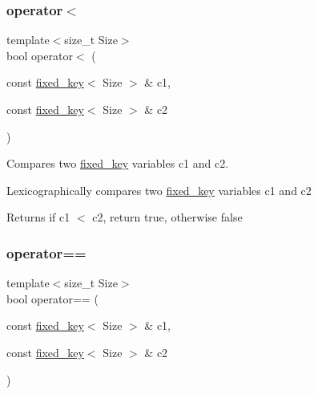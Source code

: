 \subsubsection{\texorpdfstring{operator$<$}{operator<}\hspace{0.1cm}{\footnotesize\ttfamily [2/2]}}
{\footnotesize\ttfamily template$<$size\+\_\+t Size$>$ \\
bool operator$<$ (\begin{DoxyParamCaption}\item[{const \mbox{\hyperlink{classaacio_1_1fixed__key}{fixed\+\_\+key}}$<$ Size $>$ \&}]{c1,  }\item[{const \mbox{\hyperlink{classaacio_1_1fixed__key}{fixed\+\_\+key}}$<$ Size $>$ \&}]{c2 }\end{DoxyParamCaption})\hspace{0.3cm}{\ttfamily [friend]}}



Compares two \mbox{\hyperlink{classaacio_1_1fixed__key}{fixed\+\_\+key}} variables c1 and c2. 

Lexicographically compares two \mbox{\hyperlink{classaacio_1_1fixed__key}{fixed\+\_\+key}} variables c1 and c2 \begin{DoxyReturn}{Returns}
if c1 $<$ c2, return true, otherwise false 
\end{DoxyReturn}
\mbox{\label{classaacio_1_1fixed__key_a30f70a7e52cc0469c1e48d261fec6f48}} 
\subsubsection{\texorpdfstring{operator==}{operator==}\hspace{0.1cm}{\footnotesize\ttfamily [1/2]}}
{\footnotesize\ttfamily template$<$size\+\_\+t Size$>$ \\
bool operator== (\begin{DoxyParamCaption}\item[{const \mbox{\hyperlink{classaacio_1_1fixed__key}{fixed\+\_\+key}}$<$ Size $>$ \&}]{c1,  }\item[{const \mbox{\hyperlink{classaacio_1_1fixed__key}{fixed\+\_\+key}}$<$ Size $>$ \&}]{c2 }\end{DoxyParamCaption})\hspace{0.3cm}{\ttfamily [friend]}}




